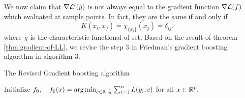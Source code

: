 We now claim that $\nabla \mathcal{L}^\prime (\hat y)$ is not always equal to the gradient function $\nabla \mathcal{L} (f)$ which evaluated at sample points. In fact, they are the same if and only if 
$$
K(x_i,x_j) = \chi_{\{x_i\}}(x_j) = \delta_{ij},
$$
where $\chi$ is the characteristic functional of set. Based on the result of theorem \ref{thm:gradient-of-LL}, we revise the step 3 in Friedman's gradient boosting algorithm in algorithm 3.

\begin{center}
\begin{minipage}{0.95\linewidth}
\begin{algorithm}[H]
\SetAlgoLined
\caption{The Revised Gradient boosting algorithm}
\KwIn{\begin{itemize}
	\vspace{-.3cm}
	\item the hypothesis $\mathcal{H}$ and the reproducing kernel $K$.
	\vspace{-.3cm}
	\item the empirical loss function $\mathcal{L}: \mathcal{H} \to \R$
	\vspace{-.3cm}
	\item number of iterations $M \geq 1$
	\vspace{-.3cm}
	\item leanring rate $\eta \in (0,1]$
\end{itemize}
}
\vspace{-.3cm}
Initialize $f_0, \quad f_0(x) = \mathop{\arg\min}_{c \in \mathbb{R}} \frac{1}{n} \sum_{i=1}^nL(y_i,c)$ for all $x \in \mathbb{R}^p.$\\
\end{algorithm}
\end{minipage}
\end{center}

